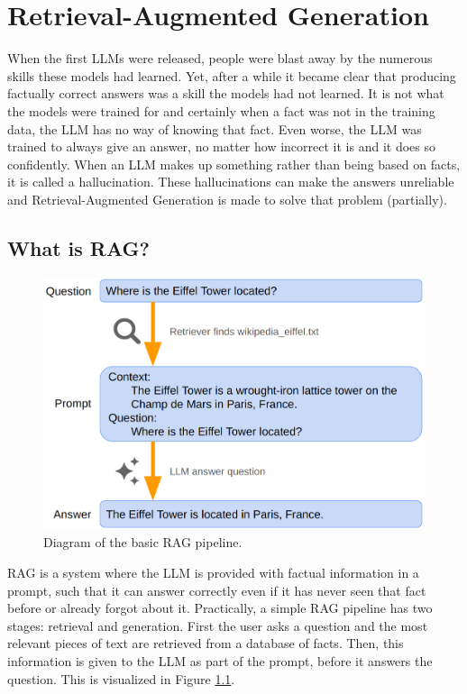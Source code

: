 
\chapter{Retrieval-Augmented Generation}

When the first LLMs were released, people were blast away by the numerous skills these models had learned. Yet, after a while it became clear that producing factually correct answers was a skill the models had not learned. It is not what the models were trained for and certainly when a fact was not in the training data, the LLM has no way of knowing that fact. Even worse, the LLM was trained to always give an answer, no matter how incorrect it is and it does so confidently. When an LLM makes up something rather than being based on facts, it is called a hallucination. These hallucinations can make the answers unreliable and Retrieval-Augmented Generation is made to solve that problem (partially).

\section{What is RAG?}

\begin{figure}[h]
	\centering
	\captionsetup{justification=centering}
	\includegraphics[width=0.6\linewidth]{fig/RAG.png}
	\caption{Diagram of the basic RAG pipeline.}
	\label{fig:rag}
\end{figure}

RAG is a system where the LLM is provided with factual information in a prompt, such that it can answer correctly even if it has never seen that fact before or already forgot about it. Practically, a simple RAG pipeline has two stages: retrieval and generation. First the user asks a question and the most relevant pieces of text are retrieved from a database of facts. Then, this information is given to the LLM as part of the prompt, before it answers the question. This is visualized in Figure \ref{fig:rag}.

